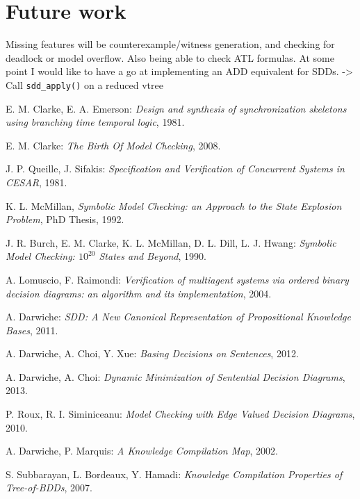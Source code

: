 \documentclass[11pt]{report}
\begin{document}
\section{Future work}

Missing features will be counterexample/witness generation, and checking for deadlock or model overflow. Also being able to check ATL formulas.
At some point I would like to have a go at implementing an ADD equivalent for SDDs.
-> Call \texttt{sdd\_apply()} on a reduced vtree


\begin{thebibliography}{9}

 E. M. Clarke, E. A. Emerson: \textit{Design and synthesis of synchronization skeletons using branching time temporal logic}, 1981.

 E. M. Clarke: \textit{The Birth Of Model Checking}, 2008.

 J. P. Queille, J. Sifakis: \textit{Specification and Verification of Concurrent Systems in CESAR}, 1981.

 K. L. McMillan, \textit{Symbolic Model Checking: an Approach to the State Explosion Problem}, PhD Thesis, 1992. 

 J. R. Burch, E. M. Clarke, K. L. McMillan, D. L. Dill, L. J. Hwang: \textit{Symbolic Model Checking: $\textit{10}^{\textit{20}}$ States and Beyond}, 1990.

 A. Lomuscio, F. Raimondi: \textit{Verification of multiagent systems via ordered binary decision diagrams: an algorithm and its implementation}, 2004. 

A. Darwiche:\emph{ SDD: A New Canonical Representation of Propositional Knowledge Bases}, 2011.

A. Darwiche, A. Choi, Y. Xue: \emph{Basing Decisions on Sentences}, 2012.

A. Darwiche, A. Choi: \textit{Dynamic Minimization of Sentential Decision Diagrams}, 2013.

 P. Roux, R. I. Siminiceanu: \textit{Model Checking with Edge Valued Decision Diagrams}, 2010. 

  A. Darwiche, P. Marquis:
  \emph{A Knowledge Compilation Map}, 2002.

S. Subbarayan, L. Bordeaux, Y. Hamadi:\textit{
Knowledge Compilation Properties of Tree-of-BDDs}, 2007.


\end{thebibliography}
\end{document}
